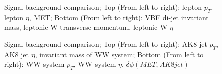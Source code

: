 \begin{figure}[h!]
	 \centering
	 \caption{Signal-background comparison; Top (From left to right): lepton $p_T$, lepton $\eta$, MET; Bottom (From left to right): VBF di-jet invariant mass, leptonic W transverse momentum, leptonic W $\eta$ }
\end{figure}
\begin{figure}[h!]\ContinuedFloat
	\caption{Signal-background comparison; Top (From left to right): AK8 jet $p_T$, AK8 jet $\eta$, invariant mass of WW system; Bottom (From left to right): WW system $p_T$, WW system $\eta$, $\delta \phi (MET, AK8 jet)$}
\end{figure}
